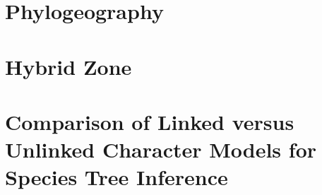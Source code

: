 \documentclass[letterpaper,12pt]{report}
\begin{document}
\begin{linenumbers}

% 

% 

\tableofcontents
{}

\listoffigures
{}

\listoftables
{}


\chapter{Phylogeography}
% 






\chapter{Hybrid Zone}
% 

% 




\chapter{Comparison of Linked versus Unlinked Character Models for Species Tree Inference}


\printbibliography[heading=subbibintoc]







\end{linenumbers}
\end{document}
